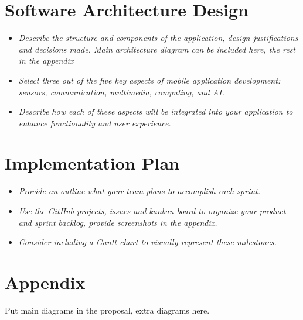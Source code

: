 \documentclass[11pt,twoside,a4paper]{article}
\begin{document}
\section{Software Architecture Design}
\begin{itemize}
    \item \emph{Describe the structure and
components of the application, design justifications and decisions made. Main architecture diagram can be included here, the rest in the appendix}
    \item \emph{Select three out of the five key aspects of mobile application development: sensors, communication, multimedia, computing, and AI.}
    \item \emph{Describe how each of these aspects will be integrated into your application to enhance functionality and user experience.}
\end{itemize}

\section{Implementation Plan}
\begin{itemize}
    \item \emph{Provide an outline what your team plans to accomplish each sprint.}
    \item \emph{Use the GitHub projects, issues and kanban board to organize your product and sprint backlog, provide screenshots in the appendix.}    
    \item \emph{Consider including a Gantt chart to visually represent these milestones. }
\end{itemize}

\newpage
\section*{Appendix}
Put main diagrams in the proposal, extra diagrams here.
\newpage

\end{document}
